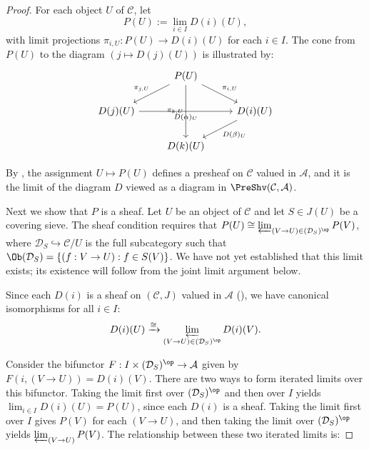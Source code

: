 \begin{proof}
For each object $U$ of $\mathcal{C}$, let
\[
P(U) := \lim_{i \in I} D(i)(U),
\]
with limit projections $\pi_{i,U}: P(U) \to D(i)(U)$ for each $i \in I$. The cone from $P(U)$ to the diagram $(j \mapsto D(j)(U))$ is illustrated by:
\[
\begin{tikzcd}
    & P(U) \arrow[ld, "\pi_{j,U}"'] \arrow[rd, "\pi_{i,U}"] \arrow[dd, "\pi_{k,U}"'] & \\
    D(j)(U) \arrow[rr, "D(\alpha)_U"'] & & D(i)(U) \arrow[ld, "D(\beta)_U"] \\
    & D(k)(U) &
\end{tikzcd}
\]

By , the assignment $U \mapsto P(U)$ defines a presheaf on $\mathcal{C}$ valued in $\mathcal{A}$, and it is the limit of the diagram $D$ viewed as a diagram in $\PreShv(\mathcal{C}, \mathcal{A})$.

Next we show that $P$ is a sheaf. Let $U$ be an object of $\mathcal{C}$ and let $S \in J(U)$ be a covering sieve. The sheaf condition requires that $P(U) \cong \varprojlim_{(V\to U) \in (\mathcal{D}_S)^{\op}} P(V)$, where $\mathcal{D}_S \hookrightarrow \mathcal{C}/U$ is the full subcategory such that $\Ob(\mathcal{D}_S) = \{(f: V \to U): f \in S(V)\}$. We have not yet established that this limit exists; its existence will follow from the joint limit argument below.

Since each $D(i)$ is a sheaf on $(\mathcal{C}, J)$ valued in $\mathcal{A}$ (), we have canonical isomorphisms for all $i \in I$:
\[
D(i)(U) \xrightarrow{\cong} \varprojlim_{(V \to U) \in (\mathcal{D}_S)^{\op}} D(i)(V).
\]

Consider the bifunctor $F: I \times (\mathcal{D}_S)^{\op} \to \mathcal{A}$ given by $F(i, (V \to U)) = D(i)(V)$. There are two ways to form iterated limits over this bifunctor. Taking the limit first over $(\mathcal{D}_S)^{\op}$ and then over $I$ yields $\lim_{i \in I} D(i)(U) = P(U)$, since each $D(i)$ is a sheaf. Taking the limit first over $I$ gives $P(V)$ for each $(V\to U)$, and then taking the limit over $(\mathcal{D}_S)^{\op}$ yields $\varprojlim_{(V\to U)} P(V)$. The relationship between these two iterated limits is:


\end{proof}
